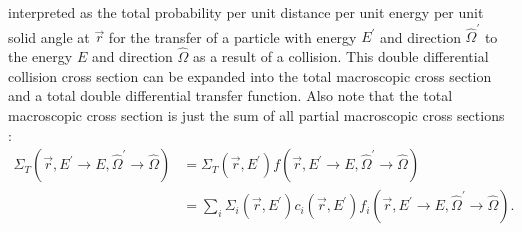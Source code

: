 interpreted as the total probability per unit distance per unit energy per unit 
solid angle at $\vec{r}$ for the transfer of a particle with energy $E^{'}$ and 
direction $\hat{\Omega}^{'}$ to the energy $E$ and direction $\hat{\Omega}$ as a
result of a collision. This double differential collision cross section can be 
expanded into the total macroscopic cross section and a total double 
differential transfer function. Also note that the total macroscopic cross 
section is just the sum of all partial macroscopic cross sections 
\citep{bell_nuclear_1979}: 
\begin{align}
  \Sigma_T(\vec{r},E^{'} \to E,\hat{\Omega}^{'} \to \hat{\Omega}) & =
  \Sigma_T(\vec{r},E^{'})
  f(\vec{r},E^{'} \to E,\hat{\Omega}^{'} \to \hat{\Omega}) \\
  & = \sum_i \Sigma_i(\vec{r},E^{'}) c_i(\vec{r},E^{'})
  f_i(\vec{r},E^{'} \to E,\hat{\Omega}^{'} \to \hat{\Omega}).
  \label{eq:expanded_diff_collision_cross_sec}
\end{align} 

